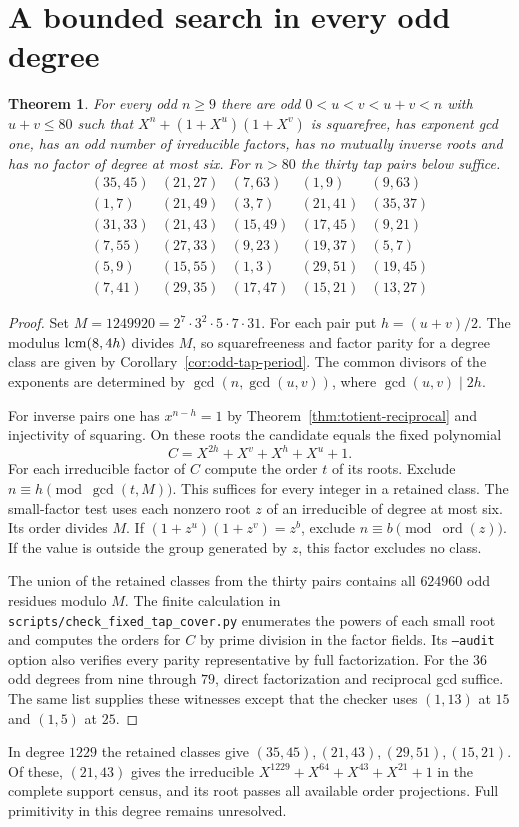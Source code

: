 \documentclass[11pt]{article}
\newtheorem{theorem}{Theorem}
\begin{document}
\section{A bounded search in every odd degree}
\label{sec:fixed-tap-cover}
\begin{theorem}\label{thm:fixed-tap-cover}
For every odd \(n\ge9\) there are odd \(0<u<v<u+v<n\) with
\(u+v\le80\) such that \(X^n+(1+X^u)(1+X^v)\) is squarefree,
has exponent gcd one, has an odd number of irreducible factors,
has no mutually inverse roots and has no factor of degree at most six.
For \(n>80\) the thirty tap pairs below suffice.
\[
\begin{array}{rrrrr}
(35,45)&(21,27)&(7,63)&(1,9)&(9,63)\\
(1,7)&(21,49)&(3,7)&(21,41)&(35,37)\\
(31,33)&(21,43)&(15,49)&(17,45)&(9,21)\\
(7,55)&(27,33)&(9,23)&(19,37)&(5,7)\\
(5,9)&(15,55)&(1,3)&(29,51)&(19,45)\\
(7,41)&(29,35)&(17,47)&(15,21)&(13,27)
\end{array}
\]
\end{theorem}
\begin{proof}
Set \(M=1249920=2^7\cdot3^2\cdot5\cdot7\cdot31\).
For each pair put \(h=(u+v)/2\). The modulus
\(\mathop{\rm lcm}(8,4h)\) divides \(M\), so squarefreeness and
factor parity for a degree class are given by
Corollary~\ref{cor:odd-tap-period}. The common divisors of the
exponents are determined by \(\gcd(n,\gcd(u,v))\), where
\(\gcd(u,v)\mid 2h\).

For inverse pairs one has \(x^{n-h}=1\) by
Theorem~\ref{thm:totient-reciprocal} and injectivity of squaring.
On these roots the candidate equals the fixed polynomial
\[
 C=X^{2h}+X^v+X^h+X^u+1.
\]
For each irreducible factor of \(C\) compute the order \(t\) of
its roots. Exclude \(n\equiv h\pmod{\gcd(t,M)}\). This suffices
for every integer in a retained class. The small-factor test uses
each nonzero root \(z\) of an irreducible of degree at most six.
Its order divides \(M\). If \((1+z^u)(1+z^v)=z^b\), exclude
\(n\equiv b\pmod{\operatorname{ord}(z)}\). If the value is outside
the group generated by \(z\), this factor excludes no class.

The union of the retained classes from the thirty pairs contains
all \(624960\) odd residues modulo \(M\). The finite calculation in
\nolinkurl{scripts/check_fixed_tap_cover.py} enumerates the powers of
each small root and computes the orders for \(C\) by prime division
in the factor fields. Its \texttt{--audit} option also verifies
every parity representative by full factorization. For the \(36\)
odd degrees from nine through \(79\), direct factorization and
reciprocal gcd suffice. The same list supplies these witnesses
except that the checker uses \((1,13)\) at \(15\) and \((1,5)\)
at \(25\).
\end{proof}
In degree \(1229\) the retained classes give \((35,45),(21,43),
(29,51),(15,21)\). Of these, \((21,43)\) gives the irreducible
\(X^{1229}+X^{64}+X^{43}+X^{21}+1\) in the complete support census,
and its root passes all available order projections. Full
primitivity in this degree remains unresolved.
\end{document}
